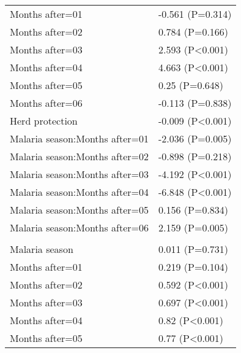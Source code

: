 \documentclass[]{article}
\begin{document}
\begin{longtable}[t]{ll}
\hspace{1em}Months after=01 & -0.561 (P=0.314)\\
\hspace{1em}Months after=02 & 0.784 (P=0.166)\\
\hspace{1em}Months after=03 & 2.593 (P<0.001)\\
\hspace{1em}Months after=04 & 4.663 (P<0.001)\\
\hspace{1em}Months after=05 & 0.25 (P=0.648)\\
\hspace{1em}Months after=06 & -0.113 (P=0.838)\\
\hspace{1em}Herd protection & -0.009 (P<0.001)\\
\hspace{1em}Malaria season:Months after=01 & -2.036 (P=0.005)\\
\hspace{1em}Malaria season:Months after=02 & -0.898 (P=0.218)\\
\hspace{1em}Malaria season:Months after=03 & -4.192 (P<0.001)\\
\hspace{1em}Malaria season:Months after=04 & -6.848 (P<0.001)\\
\hspace{1em}Malaria season:Months after=05 & 0.156 (P=0.834)\\
\hspace{1em}Malaria season:Months after=06 & 2.159 (P=0.005)\\
\addlinespace[1.5em]
\multicolumn{2}{l}{\textbf{Temporary field worker}}\\
\hspace{1em}Malaria season & 0.011 (P=0.731)\\
\hspace{1em}Months after=01 & 0.219 (P=0.104)\\
\hspace{1em}Months after=02 & 0.592 (P<0.001)\\
\hspace{1em}Months after=03 & 0.697 (P<0.001)\\
\hspace{1em}Months after=04 & 0.82 (P<0.001)\\
\hspace{1em}Months after=05 & 0.77 (P<0.001)\\

\end{longtable}
\end{document}
